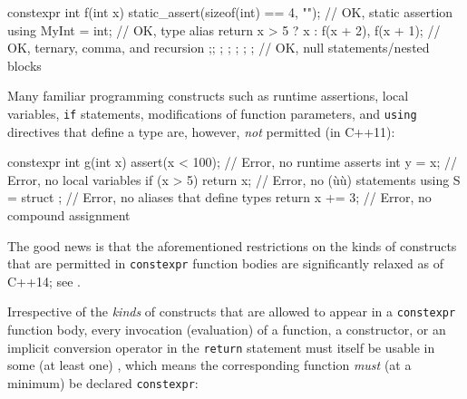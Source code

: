 \begin{emcppslisting}[emcppserrorlines={6}]
constexpr int f(int x)
{
    static_assert(sizeof(int) == 4, "");   // OK, static assertion
    using MyInt = int;                     // OK, type alias
    return x > 5 ? x : f(x + 2), f(x + 1); // OK, ternary, comma, and recursion
    ;; ;   ; { ; { ; ; } }                 // OK, null statements/nested blocks
}
\end{emcppslisting}


\noindent Many familiar programming constructs such as runtime assertions, local
variables, \lstinline!if! statements, modifications of function parameters,
and \lstinline!using! directives that define a type are, however,
\emph{not} permitted (in C++11):

\begin{emcppslisting}[emcppsignore={all errors}]
constexpr int g(int x)
{
    assert(x < 100);          // Error, no runtime asserts
    int y = x;                // Error, no local variables
    if (x > 5) { return x; }  // Error, no (ù{}ù) statements
    using S = struct { };     // Error, no aliases that define types
    return x += 3;            // Error, no compound assignment
}
\end{emcppslisting}


\noindent The good news is that the aforementioned restrictions on the kinds of
constructs that are permitted in \lstinline!constexpr! function bodies are
significantly relaxed as of C++14; see .

Irrespective of the \emph{kinds} of constructs that are allowed to
appear in a \lstinline!constexpr! function body, every invocation
(evaluation) of a function, a constructor, or an implicit conversion
operator in the \lstinline!return! statement must itself be usable in some
(at least one) , which means the
corresponding function \emph{must} (at a minimum) be declared
\lstinline!constexpr!:

